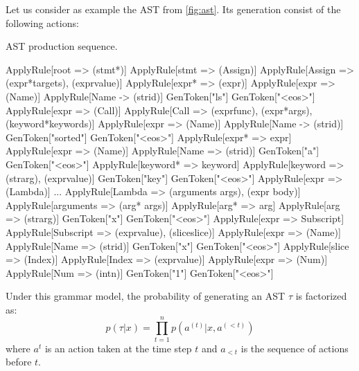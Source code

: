 Let us consider as example the AST from \cref{fig:ast}. Its generation consist of the following actions:

\begin{codelist}{AST production sequence.}
\begin{verbnobox}[\verbarg]
ApplyRule[root => (stmt*)]
    ApplyRule[stmt => (Assign)]
        ApplyRule[Assign => (expr*{targets}), (expr{value})]
            ApplyRule[expr* => (expr)]
                ApplyRule[expr => (Name)]
                    ApplyRule[Name -> (str{id})]
                        GenToken["ls"]
                        GenToken["<eos>"]
            ApplyRule[expr => (Call)]
                ApplyRule[Call => (expr{func}), (expr*{args}), (keyword*{keywords})]
                    ApplyRule[expr => (Name)]
                        ApplyRule[Name -> (str{id})]
                            GenToken["sorted"]
                            GenToken["<eos>"]
                    ApplyRule[expr* => expr]
                        ApplyRule[expr => (Name)]
                            ApplyRule[Name => (str{id})]
                                GenToken["a"]
                                GenToken["<eos>"]
                    ApplyRule[keyword* => keyword]
                        ApplyRule[keyword => (str{arg}), (expr{value})]
                            GenToken["key"]
                            GenToken["<eos>"]
                            ApplyRule[expr => (Lambda)]
...
ApplyRule[Lambda => (arguments args), (expr body)]
    ApplyRule[arguments => (arg* args)]
        ApplyRule[arg* => arg]
            ApplyRule[arg => (str{arg})]
                GenToken["x"]
                GenToken["<eos>"]
    ApplyRule[expr => Subscript]
        ApplyRule[Subscript => (expr{value}), (slice{slice})]
            ApplyRule[expr => (Name)]
                ApplyRule[Name => (str{id})]
                    GenToken["x"]
                    GenToken["<eos>"]
            ApplyRule[slice => (Index)]
                ApplyRule[Index => (expr{value})]
                    ApplyRule[expr => (Num)]
                        ApplyRule[Num => (int{n})]
                            GenToken["1"]
                            GenToken["<eos>"]
\end{verbnobox}
\label{code:ast_production}
\end{codelist}

Under this grammar model, the probability of generating an AST $\tau$ is factorized as:
\begin{equation}
p(\tau|x) = \prod^{n}_{t=1} p(a^{(t)}|x, a^{(<t)})
\label{eqn:tree_probability}
\end{equation}
where $a^{t}$ is an action taken at the time step $t$ and $a_{<t}$ is the sequence of actions before $t$. 

